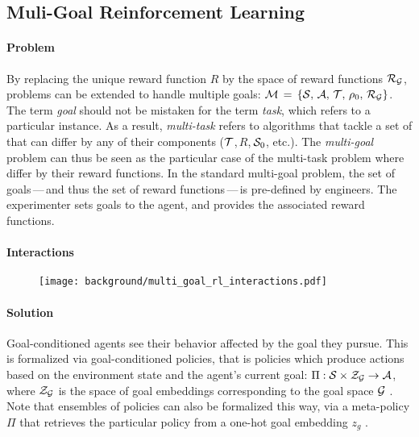 \subsection{Muli-Goal Reinforcement Learning}

\paragraph{Problem}

By replacing the unique reward function $R$ by the space of reward functions $\mathcal{R}_{\mathcal{G}}$, \rl problems can be extended to handle multiple goals: $\mathcal{M}\,=\,\{\mathcal{S},\,\mathcal{A},\,\mathcal{T},\,\rho_0,\,\mathcal{R}_{\mathcal{G}}\}$. The term \textit{goal} should not be mistaken for the term \textit{task}, which refers to a particular \mdp instance. As a result, \textit{multi-task} \rl refers to \rl algorithms that tackle a set of \mdps that can differ by any of their components (\eg $\mathcal{T}$,\,$R$,\,$\mathcal{S}_0$, etc.). The \textit{multi-goal} \rl problem can thus be seen as the particular case of the multi-task \rl problem where \mdps differ by their reward functions. In the standard multi-goal \rl problem, the set of goals\,---\,and thus the set of reward functions\,---\,is pre-defined by engineers. The experimenter sets goals to the agent, and provides the associated reward functions. 


\paragraph{Interactions}

\begin{figure}[!h]
\centering
\texttt{[image: background/multi\_goal\_rl\_interactions.pdf]}	
\caption{}
\label{fig:mg_rl_interacvtions}
\end{figure}


\paragraph{Solution}

Goal-conditioned agents see their behavior affected by the goal they pursue. This is formalized via goal-conditioned policies, that is policies which produce actions based on the environment state and the agent's current goal: $\Pi:\mathcal{S}\times\mathcal{Z}_{\mathcal{G}}\to\mathcal{A}$, where $\mathcal{Z}_{\mathcal{G}}$ is the space of goal embeddings corresponding to the goal space $\mathcal{G}$ \cite{schaul2015universal}. Note that ensembles of policies can also be formalized this way, via a meta-policy $\Pi$ that retrieves the particular policy from a one-hot goal embedding $z_g$ \cite{kaelbling1993learning,sutton2011horde}.

